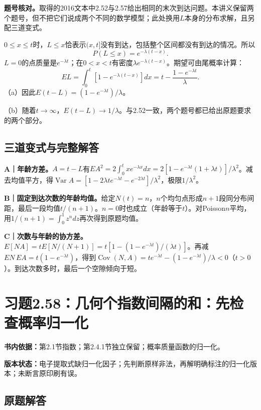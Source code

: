 \documentclass[
  11pt,
  a4paper,
  UTF8,fontset=fandol]{ctexart}
\let\OldSection\section
\renewcommand{\section}{\Needspace{7\baselineskip}\OldSection}
\let\OldSubsection\subsection
\renewcommand{\subsection}{\Needspace{5\baselineskip}\OldSubsection}
\begin{document}
\textbf{题号核对。}取得的2016文本中2.52与2.57给出相同的末次到达问题。本讲义保留两个题号，但不把它们说成两个不同的数学模型；此处换用\(L\)本身的分布求解，且另配三道变式。

\(0\le x\le t\)时，\(L\le x\)恰表示\((x,t]\)没有到达，包括整个区间都没有到达的情况。所以
\[P(L\le x)=e^{-\lambda(t-x)}.\]
\(L=0\)的点质量是\(e^{-\lambda t}\)；在\(0<x<t\)有密度\(\lambda e^{-\lambda(t-x)}\)。期望可由尾概率计算：
\[EL=\int_0^t[1-e^{-\lambda(t-x)}]dx=t-\frac{1-e^{-\lambda t}}\lambda.\]
（a）因此\(\boxed{E(t-L)=(1-e^{-\lambda t})/\lambda}\)。

（b）随着\(t\to\infty\)，\(\boxed{E(t-L)\to1/\lambda}\)。与2.52一致，两个题号都已给出原题要求的两个部分。

\subsection{三道变式与完整解答}\label{ux4e09ux9053ux53d8ux5f0fux4e0eux5b8cux6574ux89e3ux7b54-56}

\textbf{A｜年龄方差。}\(A=t-L\)有\(EA^2=2\int_0^t x e^{-\lambda x}dx=2[1-e^{-\lambda t}(1+\lambda t)]/\lambda^2\)。减去均值平方，得\(\operatorname{Var}A=[1-2\lambda t e^{-\lambda t}-e^{-2\lambda t}]/\lambda^2\)，极限\(1/\lambda^2\)。

\textbf{B｜固定到达次数的年龄均值。}给定\(N(t)=n\)，\(n\)个均匀点形成\(n+1\)段同分布间距，最后一段均值\(t/(n+1)\)。\(n=0\)时也成立（年龄等于\(t\)）。对Poisson\(n\)平均，用\(1/(n+1)=\int_0^1z^ndz\)再次得到原题均值。

\textbf{C｜次数与年龄的协方差。}\(E[NA]=tE[N/(N+1)]=t[1-(1-e^{-\lambda t})/(\lambda t)]\)。再减\(EN\,EA=t(1-e^{-\lambda t})\)，得到\(\operatorname{Cov}(N,A)=t e^{-\lambda t}-(1-e^{-\lambda t})/\lambda<0\)（\(t>0\)）。到达次数多时，最后一个空隙倾向于短。

\newpage

\section{习题2.58：几何个指数间隔的和：先检查概率归一化}\label{ux4e60ux98982.58ux51e0ux4f55ux4e2aux6307ux6570ux95f4ux9694ux7684ux548cux5148ux68c0ux67e5ux6982ux7387ux5f52ux4e00ux5316}

\textbf{书内依据：}第2.1节指数；第2.4.1节独立保留；概率质量函数的归一化。

\textbf{版本状态：}电子提取式缺归一化因子；先判断原样非法，再解明确标注的归一化版本；未断言原印刷有误。

\subsection{原题解答}\label{ux539fux9898ux89e3ux7b54-57}
\end{document}
